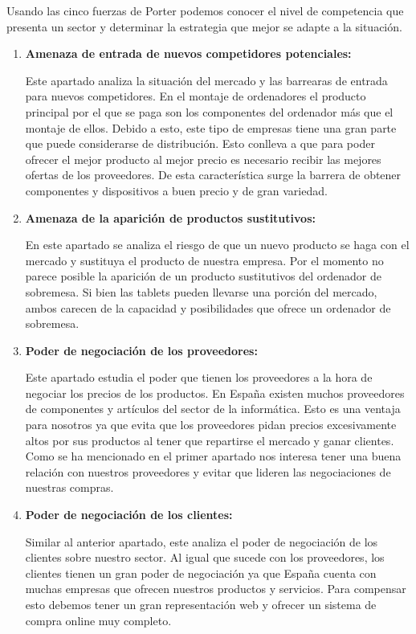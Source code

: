 Usando las cinco fuerzas de Porter podemos conocer el nivel de competencia que presenta un sector y determinar la estrategia que mejor se adapte a la situación. 

\begin{enumerate}
    \item \textbf{Amenaza de entrada de nuevos competidores potenciales:}
    
    Este apartado analiza la situación del mercado y las barrearas de entrada para nuevos competidores. En el montaje de ordenadores el producto principal por el que se paga son los componentes del ordenador más que el montaje de ellos. Debido a esto, este tipo de empresas tiene una gran parte que puede considerarse de distribución. Esto conlleva a que para poder ofrecer el mejor producto al mejor precio es necesario recibir las mejores ofertas de los proveedores. De esta característica surge la barrera de obtener componentes y dispositivos a buen precio y de gran variedad.

    \item \textbf{Amenaza de la aparición de productos sustitutivos:}
    
    En este apartado se analiza el riesgo de que un nuevo producto se haga con el mercado y sustituya el producto de nuestra empresa. Por el momento no parece posible la aparición de un producto sustitutivos del ordenador de sobremesa. Si bien las tablets pueden llevarse una porción del mercado, ambos carecen de la capacidad y posibilidades que ofrece un ordenador de sobremesa.

    \item \textbf{Poder de negociación de los proveedores:}
    
    Este apartado estudia el poder que tienen los proveedores a la hora de negociar los precios de los productos. En España existen muchos proveedores de componentes y artículos del sector de la informática. Esto es una ventaja para nosotros ya que evita que los proveedores pidan precios excesivamente altos por sus productos al tener que repartirse el mercado y ganar clientes. Como se ha mencionado en el primer apartado nos interesa tener una buena relación con nuestros proveedores y evitar que lideren las negociaciones de nuestras compras.

    \item \textbf{Poder de negociación de los clientes:}
    
    Similar al anterior apartado, este analiza el poder de negociación de los clientes sobre nuestro sector. Al igual que sucede con los proveedores, los clientes tienen un gran poder de negociación ya que España cuenta con muchas empresas que ofrecen nuestros productos y servicios. Para compensar esto debemos tener un gran representación web y ofrecer un sistema de compra online muy completo.


\end{enumerate}
